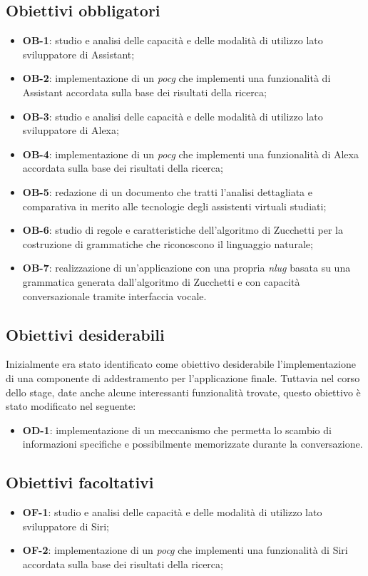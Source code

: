 	\subsection{Obiettivi obbligatori}
	\begin{itemize}
		\item \textbf{OB-1}: studio e analisi delle capacità e delle modalità di utilizzo lato sviluppatore di Assistant;
		\item \textbf{OB-2}: implementazione di un \emph{\gls{pocg}} che implementi una funzionalità di Assistant accordata sulla base dei risultati della ricerca;
		\item \textbf{OB-3}: studio e analisi delle capacità e delle modalità di utilizzo lato sviluppatore di Alexa;
		\item \textbf{OB-4}: implementazione di un \emph{\gls{pocg}} che implementi una funzionalità di Alexa accordata sulla base dei risultati della ricerca;
		\item \textbf{OB-5}: redazione di un documento che tratti l'analisi dettagliata e comparativa in merito alle tecnologie degli assistenti virtuali studiati;
		\item \textbf{OB-6}: studio di regole e caratteristiche dell'algoritmo di Zucchetti per la costruzione di grammatiche che riconoscono il linguaggio naturale;
		\item \textbf{OB-7}: realizzazione di un'applicazione con una propria \emph{\gls{nlug}} basata su una grammatica generata dall'algoritmo di Zucchetti e con capacità conversazionale tramite interfaccia vocale.
	\end{itemize}
	\subsection{Obiettivi desiderabili}
	Inizialmente era stato identificato come obiettivo desiderabile l'implementazione di una componente di addestramento per l'applicazione finale. Tuttavia nel corso dello stage, date anche alcune interessanti funzionalità trovate, questo obiettivo è stato modificato nel seguente:
	\begin{itemize}
		\item \textbf{OD-1}: implementazione di un meccanismo che permetta lo scambio di informazioni specifiche e possibilmente memorizzate durante la conversazione.
	\end{itemize}
	\subsection{Obiettivi facoltativi}
	\begin{itemize}
		\item \textbf{OF-1}: studio e analisi delle capacità e delle modalità di utilizzo lato sviluppatore di Siri;
		\item \textbf{OF-2}: implementazione di un \emph{\gls{pocg}} che implementi una funzionalità di Siri accordata sulla base dei risultati della ricerca;
	\end{itemize} 

